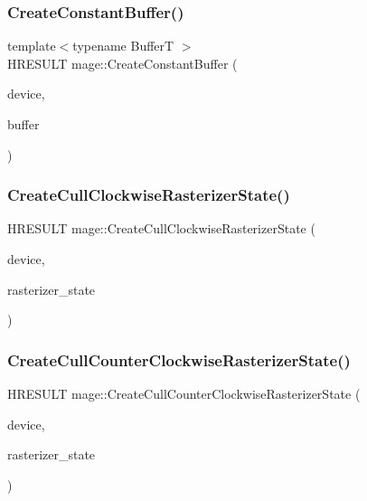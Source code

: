 \hypertarget{namespacemage_ac008dfd1f142382a04c5e3fd3a3e062e}{}\label{namespacemage_ac008dfd1f142382a04c5e3fd3a3e062e} 
\subsubsection{\texorpdfstring{Create\+Constant\+Buffer()}{CreateConstantBuffer()}}
{\footnotesize\ttfamily template$<$typename BufferT $>$ \\
H\+R\+E\+S\+U\+LT mage\+::\+Create\+Constant\+Buffer (\begin{DoxyParamCaption}\item[{I\+D3\+D11\+Device2 $\ast$}]{device,  }\item[{I\+D3\+D11\+Buffer $\ast$$\ast$}]{buffer }\end{DoxyParamCaption})}

\hypertarget{namespacemage_a033a0ae29692c9fc223e532b7487aed5}{}\label{namespacemage_a033a0ae29692c9fc223e532b7487aed5} 
\subsubsection{\texorpdfstring{Create\+Cull\+Clockwise\+Rasterizer\+State()}{CreateCullClockwiseRasterizerState()}}
{\footnotesize\ttfamily H\+R\+E\+S\+U\+LT mage\+::\+Create\+Cull\+Clockwise\+Rasterizer\+State (\begin{DoxyParamCaption}\item[{I\+D3\+D11\+Device2 $\ast$}]{device,  }\item[{I\+D3\+D11\+Rasterizer\+State $\ast$$\ast$}]{rasterizer\+\_\+state }\end{DoxyParamCaption})}

\hypertarget{namespacemage_a9d5863bf2519cdac7a59c39dec10b938}{}\label{namespacemage_a9d5863bf2519cdac7a59c39dec10b938} 
\subsubsection{\texorpdfstring{Create\+Cull\+Counter\+Clockwise\+Rasterizer\+State()}{CreateCullCounterClockwiseRasterizerState()}}
{\footnotesize\ttfamily H\+R\+E\+S\+U\+LT mage\+::\+Create\+Cull\+Counter\+Clockwise\+Rasterizer\+State (\begin{DoxyParamCaption}\item[{I\+D3\+D11\+Device2 $\ast$}]{device,  }\item[{I\+D3\+D11\+Rasterizer\+State $\ast$$\ast$}]{rasterizer\+\_\+state }\end{DoxyParamCaption})}

